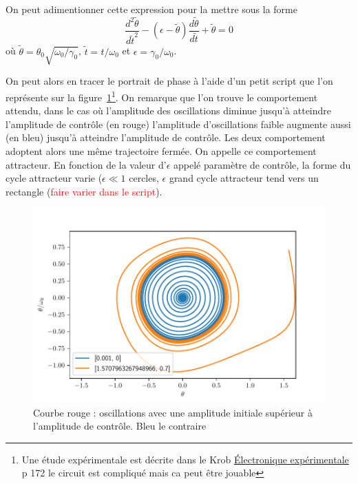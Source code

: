 \documentclass{article}
\begin{document}
On peut adimentionner cette expression pour la mettre sous la forme $$ \frac{d^2\tilde{\theta}}{d\tilde{t}^2} -\left(\epsilon -\tilde{\theta}\right)\frac{d\tilde{\theta}}{d\tilde{t}}+\tilde{\theta}=0$$ où $\tilde{\theta}= \theta_0\sqrt{\omega_0/\gamma_0}$, $\tilde{t}= t/\omega_0$ et $\epsilon = \gamma_0/\omega_0$.

On peut alors en tracer le portrait de phase à l'aide d'un petit script que l'on représente sur la figure~\ref{fig:Vanderpol}\footnote{Une étude expérimentale est décrite dans le Krob \uline{Électronique expérimentale} p 172 le circuit est compliqué mais ca peut être jouable}. On remarque que l'on trouve le comportement attendu, dans le cas où l'amplitude des oscillations diminue jusqu'à atteindre l'amplitude de contrôle (en rouge) l'amplitude d'oscillations faible augmente aussi (en bleu) jusqu'à atteindre l'amplitude de contrôle. Les deux comportement adoptent alors une même trajectoire fermée. On appelle ce comportement attracteur. En fonction de la valeur d'$\epsilon$ appelé paramètre de contrôle, la forme du cycle attracteur varie ($\epsilon \ll 1$ cercles, $\epsilon$ grand cycle attracteur tend vers un rectangle (\textcolor{red}{faire varier dans le script}). 

\begin{figure}
    \centering
    \includegraphics[width=0.9\linewidth]{portrait_phase_van_der_pol.pdf}
    \caption{Courbe rouge : oscillations avec une amplitude initiale supérieur à l'amplitude de contrôle. Bleu le contraire}
    \label{fig:Vanderpol}
\end{figure}
\end{document}
